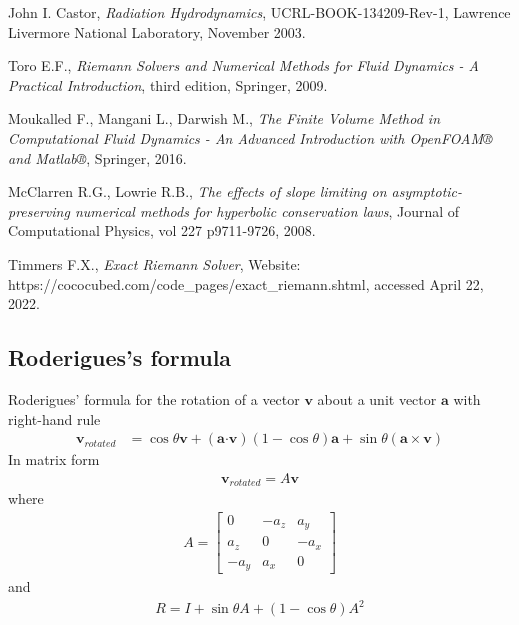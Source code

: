 \documentclass[10pt,letterpaper,notitlepage]{article}
\numberwithin{equation}{section}
\newcommand{\dotp}{\boldsymbol{\cdot}}
\newcommand{\beqn}{\begin{equation}\begin{aligned}}
\newcommand{\eeqn}{\end{aligned}\end{equation}}
\begin{document}
\newpage
\begin{thebibliography}{1}
	

	 John I. Castor, {\em Radiation Hydrodynamics}, UCRL-BOOK-134209-Rev-1, Lawrence Livermore National Laboratory, November 2003.
	
	 Toro E.F., {\em Riemann Solvers and Numerical Methods for Fluid Dynamics - A Practical Introduction}, third edition, Springer, 2009.
	
	 Moukalled F.,  Mangani L., Darwish M., {\em The Finite Volume Method in Computational Fluid Dynamics - An Advanced Introduction with OpenFOAM® and Matlab®}, Springer, 2016.
	
	 McClarren R.G., Lowrie R.B., {\em The effects of slope limiting on asymptotic-preserving numerical methods for hyperbolic conservation laws}, Journal of Computational Physics, vol 227 p9711-9726, 2008.
	
	 Timmers F.X., {\em Exact Riemann Solver}, Website: https://cococubed.com/code\_pages/exact\_riemann.shtml, accessed April 22, 2022.
	
	   
\end{thebibliography}

\newpage
\begin{appendices}
\section{Roderigues's formula} \label{appendix:Roderigues_formula}
Roderigues' formula for the rotation of a vector $\mathbf{v}$ about a unit vector $\mathbf{a}$ with right-hand rule
\begin{equation}
\newcommand{\vvec}{\mathbf{v}}
\newcommand{\avec}{\mathbf{a}}
\begin{aligned}
\vvec_{rotated} &= \cos \theta \vvec + (\avec \dotp \vvec)(1-\cos \theta) \avec + \sin \theta (\avec \times \vvec)
\end{aligned}
\end{equation}
In matrix form
\beqn 
\mathbf{v}_{rotated} = A \mathbf{v}
\eeqn 
where
\beqn 
A = 
\begin{bmatrix}
0 & -a_z & a_y \\
a_z & 0 & -a_x \\
-a_y & a_x & 0
\end{bmatrix}
\eeqn 
and
\beqn 
R = I + \sin\theta A + (1-\cos\theta) A^2
\eeqn


\end{appendices}
\end{document}
